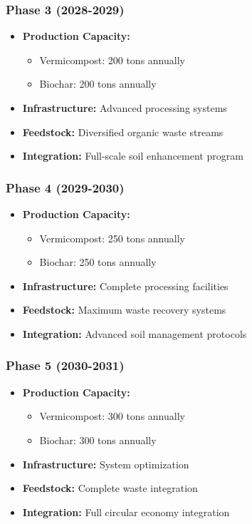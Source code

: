 \subsubsection{Phase 3 (2028-2029)}
\begin{itemize}
    \item \textbf{Production Capacity:}
    \begin{itemize}
        \item Vermicompost: 200 tons annually
        \item Biochar: 200 tons annually
    \end{itemize}
    \item \textbf{Infrastructure:} Advanced processing systems
    \item \textbf{Feedstock:} Diversified organic waste streams
    \item \textbf{Integration:} Full-scale soil enhancement program
\end{itemize}

\subsubsection{Phase 4 (2029-2030)}
\begin{itemize}
    \item \textbf{Production Capacity:}
    \begin{itemize}
        \item Vermicompost: 250 tons annually
        \item Biochar: 250 tons annually
    \end{itemize}
    \item \textbf{Infrastructure:} Complete processing facilities
    \item \textbf{Feedstock:} Maximum waste recovery systems
    \item \textbf{Integration:} Advanced soil management protocols
\end{itemize}

\subsubsection{Phase 5 (2030-2031)}
\begin{itemize}
    \item \textbf{Production Capacity:}
    \begin{itemize}
        \item Vermicompost: 300 tons annually
        \item Biochar: 300 tons annually
    \end{itemize}
    \item \textbf{Infrastructure:} System optimization
    \item \textbf{Feedstock:} Complete waste integration
    \item \textbf{Integration:} Full circular economy integration
\end{itemize}

